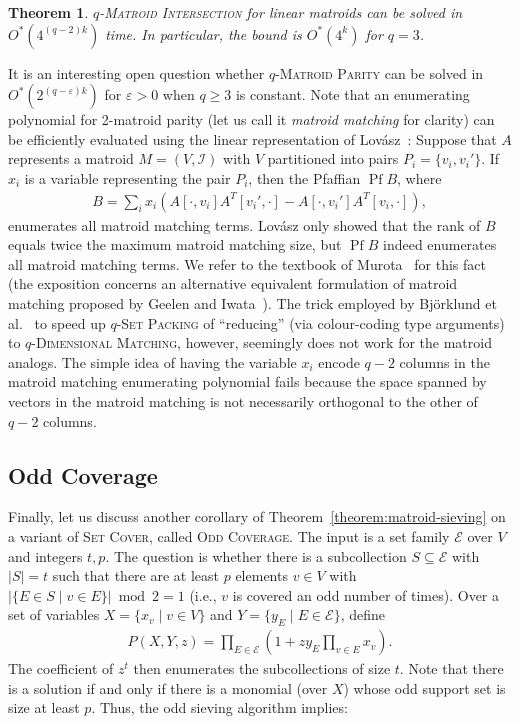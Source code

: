 \documentclass[10pt,a4paper]{article}
\newtheorem{theorem}{Theorem}[section]
\newcommand{\cI}{\ensuremath{\mathcal I}\xspace}
\newcommand{\cE}{\ensuremath{\mathcal E}\xspace}
\DeclareMathOperator{\Pf}{Pf}
\begin{document}
\begin{theorem} \label{thm:general-intersection}
  \textsc{$q$-Matroid Intersection} for linear matroids can be solved in $O^*(4^{(q - 2)k})$ time.
  In particular, the bound is $O^*(4^k)$ for $q = 3$.
\end{theorem}

It is an interesting open question whether \textsc{$q$-Matroid Parity} can be solved in $O^*(2^{(q - \varepsilon)k})$ for $\varepsilon > 0$ when $q \ge 3$ is constant.
Note that an enumerating polynomial for 2-matroid parity (let us call it \emph{matroid matching} for clarity) can be efficiently evaluated using the linear representation of Lov\'asz~\cite{Lovasz79}:
Suppose that $A$ represents a matroid $M = (V, \cI)$ with $V$ partitioned into pairs $P_i = \{ v_i, v_i' \}$.
If $x_i$ is a variable representing the pair $P_i$, then the Pfaffian $\Pf B$, where
\begin{align*}
   B = \sum_i x_i (A[\cdot, v_i] A^T[v_i', \cdot] - A[\cdot, v_i'] A^T[v_i, \cdot]),
\end{align*}
enumerates all matroid matching terms.
Lov\'asz \cite{Lovasz79} only showed that the rank of $B$ equals twice the maximum matroid matching size, but $\Pf B$ indeed enumerates all matroid matching terms.
We refer to the textbook of Murota~\cite[Section 7.3.4]{murota1999matrices} for this fact (the exposition concerns an alternative equivalent formulation of matroid matching proposed by Geelen and Iwata~\cite{GeelenI05}).
The trick employed by Bj\"{o}rklund et al.~\cite{BjorklundHKK17narrow} to speed up \textsc{$q$-Set Packing} of ``reducing'' (via colour-coding type arguments) to \textsc{$q$-Dimensional Matching}, however, seemingly does not work for the matroid analogs.
The simple idea of having the variable $x_i$ encode $q - 2$ columns in the matroid matching enumerating polynomial fails because the space spanned by vectors in the matroid matching is not necessarily orthogonal to the other of $q - 2$ columns.

\subsection{Odd Coverage}
Finally, let us discuss another corollary of Theorem~\ref{theorem:matroid-sieving} on a variant of \textsc{Set Cover}, called \textsc{Odd Coverage}.
The input is a set family $\cE$ over $V$ and integers $t, p$.
The question is whether there is a subcollection $S \subseteq \cE$ with $|S| = t$ such that there are at least $p$ elements $v \in V$ with $|\{ E \in S \mid v \in E \}| \bmod 2 = 1$ (i.e., $v$ is covered an odd number of times).
Over a set of variables $X = \{ x_v \mid v \in V \}$ and $Y = \{ y_E \mid E \in \cE \}$, define
\begin{align*}
  P(X, Y, z) = \prod_{E \in \cE} \left(1 + z y_E \prod_{v \in E} x_v \right).
\end{align*}
The coefficient of $z^t$ then enumerates the subcollections of size $t$.
Note that there is a solution if and only if there is a monomial (over $X$) whose odd support set is size at least $p$.
Thus, the odd sieving algorithm implies:
\end{document}

